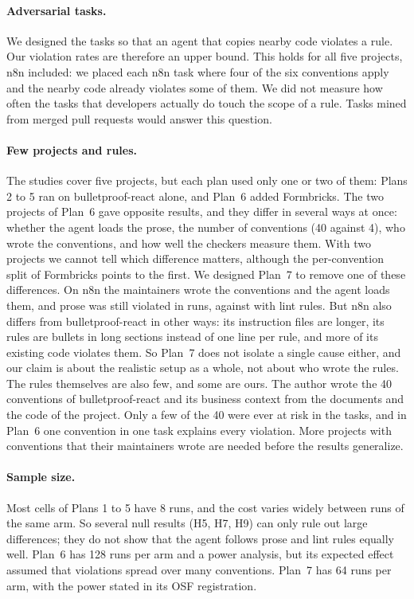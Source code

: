 \documentclass[pdflatex,sn-basic]{sn-jnl}
\begin{document}
\paragraph{Adversarial tasks.}
We designed the tasks so that an agent that copies nearby code violates a rule.
Our violation rates are therefore an upper bound.
This holds for all five projects, n8n included: we placed each n8n task where four of the six conventions apply and the nearby code already violates some of them.
We did not measure how often the tasks that developers actually do touch the scope of a rule.
Tasks mined from merged pull requests would answer this question.

\paragraph{Few projects and rules.}
The studies cover five projects, but each plan used only one or two of them: Plans 2 to 5 ran on bulletproof-react alone, and Plan~6 added Formbricks.
The two projects of Plan~6 gave opposite results, and they differ in several ways at once: whether the agent loads the prose, the number of conventions (40 against 4), who wrote the conventions, and how well the checkers measure them.
With two projects we cannot tell which difference matters, although the per-convention split of Formbricks points to the first.
We designed Plan~7 to remove one of these differences.
On n8n the maintainers wrote the conventions and the agent loads them, and prose was still violated in \HSixteenProse{} runs, against \HSixteenRules{} with lint rules.
But n8n also differs from bulletproof-react in other ways: its instruction files are longer, its rules are bullets in long sections instead of one line per rule, and more of its existing code violates them.
So Plan~7 does not isolate a single cause either, and our claim is about the realistic setup as a whole, not about who wrote the rules.
The rules themselves are also few, and some are ours.
The author wrote the 40 conventions of bulletproof-react and its business context from the documents and the code of the project.
Only a few of the 40 were ever at risk in the tasks, and in Plan~6 one convention in one task explains every violation.
More projects with conventions that their maintainers wrote are needed before the results generalize.

\paragraph{Sample size.}
Most cells of Plans 1 to 5 have 8 runs, and the cost varies widely between runs of the same arm.
So several null results (H5, H7, H9) can only rule out large differences; they do not show that the agent follows prose and lint rules equally well.
Plan~6 has 128 runs per arm and a power analysis, but its expected effect assumed that violations spread over many conventions.
Plan~7 has 64 runs per arm, with the power stated in its OSF registration.
\end{document}
